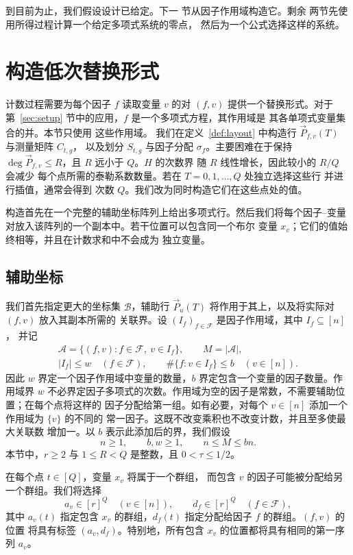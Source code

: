 \documentclass[11pt,reqno]{amsart}
\numberwithin{equation}{section}
\theoremstyle{definition}\newtheorem{definition}[theorem]{定义}
\theoremstyle{remark}\newtheorem{remark}[theorem]{注}
\renewcommand{\le}{\leqslant}
\renewcommand{\ge}{\geqslant}
\begin{document}
到目前为止，我们假设设计已给定。下一
节从因子作用域构造它。剩余
两节先使用所得过程计算一个给定多项式系统的零点，
然后为一个公式选择这样的系统。

\section{构造低次替换形式}\label{sec:construction}
计数过程需要为每个因子 $f$ 读取变量 $v$ 的对 $(f,v)$
提供一个替换形式。对于
第~\ref{sec:setup} 节中的应用，$f$ 是一个多项式方程，其作用域是
其各单项式变量集合的并。本节只使用
这些作用域。
我们在定义~\ref{def:layout} 中构造行 $\vec{P}_{f,v}(T)$ 与测量矩阵 $C_{t,g}$，
以及划分 $S_{t,g}$
与因子分配 $\sigma_f$。主要困难在于保持
$\deg \vec{P}_{f,v}\le R$，且 $R$ 远小于 $Q$。$H$ 的次数界
随 $R$ 线性增长，因此较小的 $R/Q$ 会减少
每个点所需的泰勒系数数量。若在 $T=0,1,\ldots,Q$ 处独立选择这些行
并进行插值，通常会得到
次数 $Q$。我们改为同时构造它们在这些点处的值。

构造首先在一个完整的辅助坐标阵列上给出多项式行。然后我们将每个因子--变量对放入该阵列的一个副本中。若干位置可以包含同一个布尔
变量 $x_v$；它们的值始终相等，并且在计数求和中不会成为
独立变量。

\subsection{辅助坐标}\label{subsec:incidence-layout}
我们首先指定更大的坐标集 $\mathcal B$，辅助行
$\vec{P}_u(T)$ 将作用于其上，以及将实际对 $(f,v)$ 放入其副本所需的
关联界。设 $(I_f)_{f\in\mathcal F}$ 是因子作用域，其中 $I_f\subseteq[n]$，
并记
\begin{equation}\label{eq:factor-incidences}
 \begin{gathered}
 \mathcal A=\{(f,v):f\in\mathcal F,\ v\in I_f\},\qquad M=|\mathcal A|,\\
 |I_f|\le w\quad(f\in\mathcal F),\qquad
 \#\{f:v\in I_f\}\le b\quad(v\in[n]).
 \end{gathered}
\end{equation}
因此 $w$ 界定一个因子作用域中变量的数量，$b$
界定包含一个变量的因子数量。作用域界
$w$ 不必界定因子多项式的次数。作用域为空的因子是常数，不需要辅助位置；在每个点将这样的
因子分配给第一组。如有必要，对每个 $v\in[n]$ 添加一个作用域为 $\{v\}$ 的不同的
常一因子。这既不改变乘积也不改变计数，并且至多使最大关联数
增加一。以 $b$ 表示此添加后的界，我们假设
\[
 n\ge1,\qquad b,w\ge1,\qquad n\le M\le bn.
\]
本节中，$r\ge2$ 与 $1\le R<Q$ 是整数，且
$0<\tau\le1/2$。

在每个点 $t\in[Q]$，变量 $x_v$ 将属于一个群组，
而包含 $v$ 的因子可能被分配给另一个群组。我们将选择
\[
 a_v\in[r]^Q\quad(v\in[n]),\qquad
 d_f\in[r]^Q\quad(f\in\mathcal F),
\]
其中 $a_v(t)$ 指定包含 $x_v$ 的群组，$d_f(t)$
指定分配给因子 $f$ 的群组。$(f,v)$ 的位置
将具有标签 $(a_v,d_f)$。特别地，所有包含
$x_v$ 的位置都将具有相同的第一序列 $a_v$。
\end{document}
